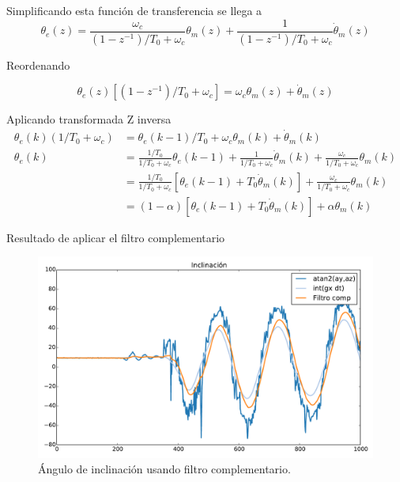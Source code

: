 \documentclass[11pt]{article} %
\begin{document}
Simplificando esta función de transferencia se llega a
\[ \theta_e(z) = \frac{\omega_c}{(1-z^{-1})/T_0 + \omega_c} \theta_m (z) + \frac{1}{(1-z^{-1})/T_0 + \omega_c} \dot{\theta}_m(z) \]

Reordenando

\[ \theta_e(z)\left[ (1-z^{-1})/T_0 + \omega_c \right] = 
\omega_c \theta_m(z) + \dot{\theta}_m(z) \]

Aplicando transformada Z inversa
\begin{align*}
\theta_e(k)(1/T_0 + \omega_c) &= \theta_e(k-1)/T_0 + \omega_c \theta_m(k) + \dot{\theta}_m(k) \\
\theta_e(k) &= \frac{1/T_0}{1/T_0 + \omega_c} \theta_e(k-1) 
				+ \frac{1}{1/T_0 + \omega_c} \dot{\theta}_m(k) 
				+ \frac{\omega_c}{1/T_0 + \omega_c} \theta_m(k) \\
				&= \frac{1/T_0}{1/T_0 + \omega_c}[\theta_e(k-1) 
				+ T_0 \dot{\theta}_m(k) ]
				+ \frac{\omega_c}{1/T_0 + \omega_c} \theta_m(k)  \\
				&= (1-\alpha)[\theta_e(k-1) + T_0 \dot{\theta}_m(k) ] + \alpha \theta_m(k)
\end{align*}

Resultado de aplicar el filtro complementario
\begin{figure}[h!tb]
\centering
\includegraphics[width=0.9\linewidth]{tilt}
\caption{Ángulo de inclinación usando filtro complementario.}
\label{fig:comp_filt}
\end{figure}
\end{document}
